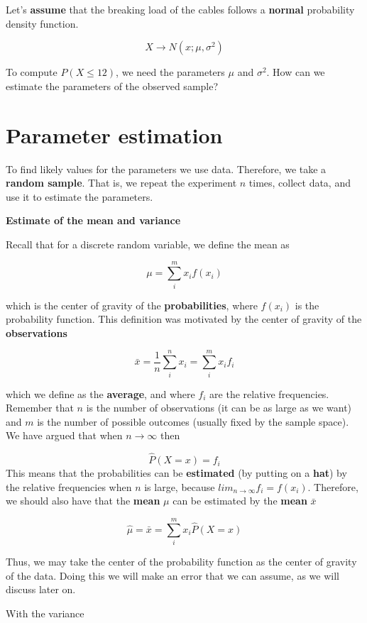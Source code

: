 \documentclass[
]{book}
\begin{document}
Let's \textbf{assume} that the breaking load of the cables follows a \textbf{normal} probability density function.

\[X \rightarrow N(x; \mu, \sigma^2)\]

To compute \(P(X \leq 12)\), we need the parameters \(\mu\) and \(\sigma^2\). How can we estimate the parameters of the observed sample?

\hypertarget{parameter-estimation}{%
\section{Parameter estimation}\label{parameter-estimation}}

To find likely values for the parameters we use data. Therefore, we take a \textbf{random sample}. That is, we repeat the experiment \(n\) times, collect data, and use it to estimate the parameters.

\textbf{Estimate of the mean and variance}

Recall that for a discrete random variable, we define the mean as

\[\mu=\sum_{i}^m x_if(x_i)\]

which is the center of gravity of the \textbf{probabilities}, where \(f(x_i)\) is the probability function. This definition was motivated by the center of gravity of the \textbf{observations}

\[\bar{x}= \frac{1}{n} \sum_{i}^n x_i = \sum_{i}^m x_if_i\]

which we define as the \textbf{average}, and where \(f_i\) are the relative frequencies. Remember that \(n\) is the number of observations (it can be as large as we want) and \(m\) is the number of possible outcomes (usually fixed by the sample space). We have argued that when \(n \rightarrow \infty\) then

\[\hat{P}(X=x)=f_i\]
This means that the probabilities can be \textbf{estimated} (by putting on a \textbf{hat}) by the relative frequencies when \(n\) is large, because \(lim_{n\rightarrow \infty}f_i=f(x_i)\). Therefore, we should also have that the \textbf{mean} \(\mu\) can be estimated by the \textbf{mean} \(\bar{x}\)

\[\hat{\mu}=\bar{x}= \sum_{i}^m x_i\hat{P}(X=x)\]

Thus, we may take the center of the probability function as the center of gravity of the data. Doing this we will make an error that we can assume, as we will discuss later on.

With the variance
\end{document}
